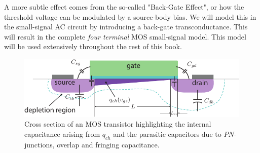 A more subtle effect comes from the so-called "Back-Gate Effect", or how the threshold voltage can be modulated by a source-body bias.  We will model this in the small-signal AC circuit by introducing a back-gate transconductance.  This will result in the complete \emph{four terminal} MOS small-signal model.  This model will be used extensively throughout the rest of this book.
%
%
%
% 
\newpage
\begin{figure}[t]
\centering
\includegraphics[width=\columnwidth]{mos_caps_xsect}
\caption{Cross section of an MOS transistor highlighting the internal capacitance arising from $q_{ch}$ and the parasitic capacitors due to $PN$-junctions, overlap and fringing capacitance.}
\label{fig:moscapsxsect}
\end{figure}

